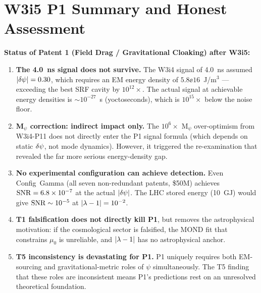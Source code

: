 \section{W3i5 P1 Summary and Honest Assessment}
\label{sec:summary}

\begin{tcolorbox}[colback=red!3!white, colframe=red!60!black,
  title=\textbf{W3i5 P1: Complete Honest Assessment}]
\textbf{Status of Patent 1 (Field Drag / Gravitational Cloaking) after W3i5:}

\begin{enumerate}[label=\textbf{\arabic*.}, itemsep=6pt]

\item \textbf{The 4.0~ns signal does not survive.}
The W3i4 signal of 4.0~ns assumed $|\delta\psi| = 0.30$, which requires an EM
energy density of $5.8\ee{16}$~J/m$^3$ --- exceeding the best SRF cavity
by $10^{12}\times$. The actual signal at achievable energy densities is
$\sim 10^{-27}$~s (yoctoseconds), which is $10^{15}\times$ below the noise
floor.

\item \textbf{M$_\psi$ correction: indirect impact only.}
The $10^6\times$ M$_\psi$ over-optimism from W3i4-P11 does not directly
enter the P1 signal formula (which depends on static $\delta\psi$, not mode
dynamics). However, it triggered the re-examination that revealed the far
more serious energy-density gap.

\item \textbf{No experimental configuration can achieve detection.}
Even Config~Gamma (all seven non-redundant patents, \$50M) achieves
$\mathrm{SNR} = 6.8\times 10^{-7}$ at the actual $|\delta\psi|$. The LHC stored energy
(10~GJ) would give $\mathrm{SNR} \sim 10^{-5}$ at $|\lambda - 1| = 10^{-2}$.

\item \textbf{T1 falsification does not directly kill P1}, but removes
the astrophysical motivation: if the cosmological sector is falsified,
the MOND fit that constrains $\mu_0$ is unreliable, and $|\lambda - 1|$ has
no astrophysical anchor.

\item \textbf{T5 inconsistency is devastating for P1.}
P1 uniquely requires both EM-sourcing and gravitational-metric roles of
$\psi$ simultaneously. The T5 finding that these roles are inconsistent
means P1's predictions rest on an unresolved theoretical foundation.


\end{enumerate}
\end{tcolorbox}
